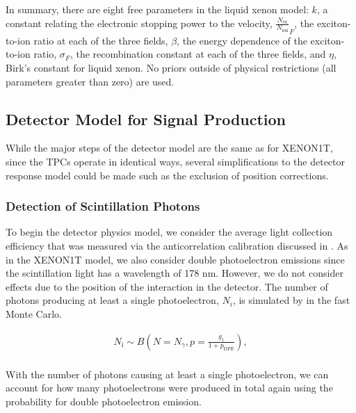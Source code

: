 In summary, there are eight free parameters in the liquid xenon model: $k$, a constant relating the electronic stopping power to the velocity, $\frac{N_{\textrm{ex}}}{N_{\textrm{ion}}}_F$, the exciton-to-ion ratio at each of the three fields, $\beta$, the energy dependence of the exciton-to-ion ratio, $\sigma_F$, the recombination constant at each of the three fields, and $\eta$, Birk's constant for liquid xenon.  No priors outside of physical restrictions (all parameters greater than zero) are used.



\subsection{Detector Model for Signal Production}

While the major steps of the detector model are the same as for XENON1T, since the TPCs operate in identical ways, several simplifications to the detector response model could be made such as the exclusion of position corrections.  


\subsubsection{Detection of Scintillation Photons}


To begin the detector physics model, we consider the average light collection efficiency that was measured via the anticorrelation calibration discussed in .  As in the XENON1T model, we also consider double photoelectron emissions \cite{faham2015measurements} since the scintillation light has a wavelength of 178 nm.  However, we do not consider effects due to the position of the interaction in the detector.  The number of photons producing at least a single photoelectron, $N_i$, is simulated by \eqnref{} in the fast Monte Carlo.


\begin{equation}
        \label{eqn:nerix_binomial_lce}
        \begin{gathered}
                N_{\textrm{i}} \sim B \left( N = N_{\gamma}, p = \frac{g_1}{1 + p_{\textrm{DPE}}} \right), \\
        \end{gathered}
\end{equation}


With the number of photons causing at least a single photoelectron, we can account for how many photoelectrons were produced in total again using the probability for double photoelectron emission.


